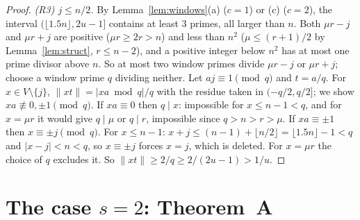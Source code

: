 \documentclass[11pt]{article}
\theoremstyle{remark}
\newcommand{\norm}[1]{\lVert #1\rVert}
\begin{document}
\begin{proof}
\emph{(R3) $j\le n/2$.} By Lemma~\ref{lem:windows}(a) ($c=1$) or (c) ($c=2$), the interval $(\lfloor1.5n\rfloor,2u-1]$ contains at least $3$ primes, all larger than $n$. Both $\mu r-j$ and $\mu r+j$ are positive ($\mu r\ge2r>n$) and less than $n^2$ ($\mu\le(r+1)/2$ by Lemma~\ref{lem:struct}, $r\le n-2$), and a positive integer below $n^2$ has at most one prime divisor above $n$. So at most two window primes divide $\mu r-j$ or $\mu r+j$; choose a window prime $q$ dividing neither. Let $aj\equiv1\pmod q$ and $t=a/q$. For $x\in V\setminus\{j\}$, $\norm{xt}=|xa\bmod q|/q$ with the residue taken in $(-q/2,q/2]$; we show $xa\not\equiv0,\pm1\pmod q$. If $xa\equiv0$ then $q\mid x$: impossible for $x\le n-1<q$, and for $x=\mu r$ it would give $q\mid\mu$ or $q\mid r$, impossible since $q>n>r>\mu$. If $xa\equiv\pm1$ then $x\equiv\pm j\pmod q$. For $x\le n-1$: $x+j\le(n-1)+\lfloor n/2\rfloor=\lfloor1.5n\rfloor-1<q$ and $|x-j|<n<q$, so $x\equiv\pm j$ forces $x=j$, which is deleted. For $x=\mu r$ the choice of $q$ excludes it. So $\norm{xt}\ge2/q\ge2/(2u-1)>1/u$.
\end{proof}

\section{\texorpdfstring{The case $s=2$: Theorem~A}{The case s=2: Theorem A}}\label{sec:A}
\end{document}
